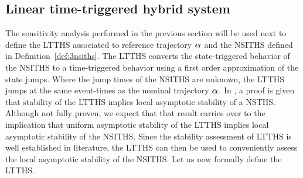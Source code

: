 \documentclass[../DC2017114Bouma.tex]{subfiles}
\begin{document}
\subsection{Linear time-triggered hybrid system}
The sensitivity analysis performed in the previous section will be used next to define the LTTHS associated to reference trajectory $\boldsymbol{\alpha}$ and the NSITHS defined in Definition~\ref{def:3nsiths}. The LTTHS converts the state-triggered behavior of the NSITHS to a time-triggered behavior using a first order approximation of the state jumps. Where the jump times of the NSITHS are unknown, the LTTHS jumps at the same event-times as the nominal trajectory $\boldsymbol{\alpha}$. In \cite{Rijnen2017}, a proof is given that stability of the LTTHS implies local asymptotic stability of a NSTHS. Although not fully proven, we expect that that result carries over to the implication that uniform asymptotic stability of the LTTHS implies local asymptotic stability of the NSITHS. Since the stability assessment of LTTHS is well established in literature, the LTTHS can then be used to conveniently assess the local asymptotic stability of the NSITHS. Let us now formally define the LTTHS.
\end{document}
